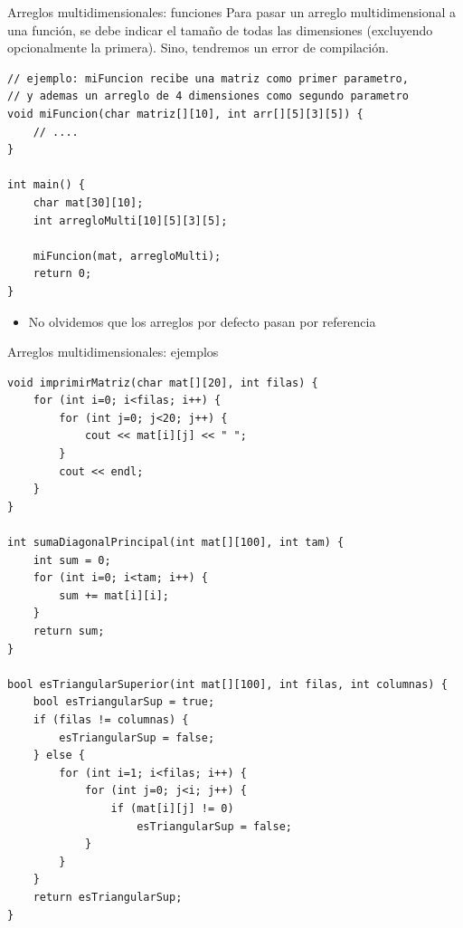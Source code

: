 \documentclass[12pt]{beamer}
\begin{document}
\begin{frame}[fragile]{Arreglos multidimensionales: funciones}
    Para pasar un arreglo multidimensional a una función, se debe indicar el tamaño de todas las dimensiones (excluyendo opcionalmente la primera). Sino, tendremos un error de compilación.

    \smallskip

\begin{lstlisting}[basicstyle=\tiny]
// ejemplo: miFuncion recibe una matriz como primer parametro,
// y ademas un arreglo de 4 dimensiones como segundo parametro
void miFuncion(char matriz[][10], int arr[][5][3][5]) {
    // ....
}        

int main() {
    char mat[30][10];
    int arregloMulti[10][5][3][5];
    
    miFuncion(mat, arregloMulti);
    return 0;
}
\end{lstlisting}

    \smallskip

    \begin{itemize}
        \item No olvidemos que los arreglos \alert{por defecto pasan por referencia}
    \end{itemize}
\end{frame}

\begin{frame}[fragile]{Arreglos multidimensionales: ejemplos}
\begin{lstlisting}[basicstyle=\tiny]
void imprimirMatriz(char mat[][20], int filas) {
    for (int i=0; i<filas; i++) {
        for (int j=0; j<20; j++) {
            cout << mat[i][j] << " ";
        }
        cout << endl;
    }
}

int sumaDiagonalPrincipal(int mat[][100], int tam) {
    int sum = 0;
    for (int i=0; i<tam; i++) {
        sum += mat[i][i];
    }
    return sum;
}

bool esTriangularSuperior(int mat[][100], int filas, int columnas) {
    bool esTriangularSup = true;
    if (filas != columnas) {
        esTriangularSup = false;
    } else {
        for (int i=1; i<filas; i++) {
            for (int j=0; j<i; j++) {
                if (mat[i][j] != 0)
                    esTriangularSup = false;
            }
        }
    }
    return esTriangularSup;
}
\end{lstlisting}
\end{frame}
\end{document}
